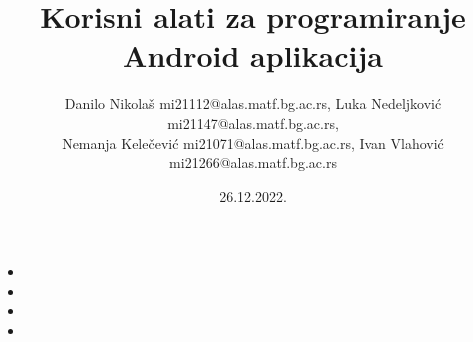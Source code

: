 \documentclass{beamer}
\title{Korisni alati za programiranje Android aplikacija}
\author{Danilo Nikolaš mi21112@alas.matf.bg.ac.rs,
 Luka Nedeljković mi21147@alas.matf.bg.ac.rs,
\\ Nemanja Kelečević mi21071@alas.matf.bg.ac.rs,
 Ivan Vlahović mi21266@alas.matf.bg.ac.rs}
\institute[]{Matematički fakultet, Univerzitet u Beogradu}
\date{26.12.2022.}
\begin{document}
\begin{frame}
	\titlepage
\end{frame}

\begin{frame}
    \frametitle{} 
    \begin{itemize}
			\item
			\item 
			\item 
			\item  
   \end{itemize}
\end{frame}
\end{document}
